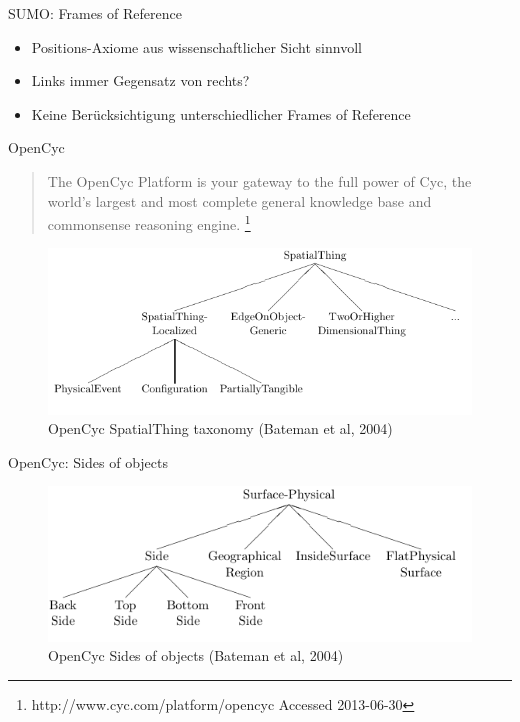 \documentclass[12pt,a4paper]{beamer}
\begin{document}
\begin{frame}{SUMO: Frames of Reference}
\begin{itemize}
\item Positions-Axiome aus wissenschaftlicher Sicht sinnvoll
\item Links immer Gegensatz von rechts?
\item Keine Berücksichtigung unterschiedlicher Frames of Reference
\end{itemize}
\end{frame}


\begin{frame}{OpenCyc}
\begin{quote}
The OpenCyc Platform is your gateway to the full power of Cyc, the world's largest and most complete general knowledge base and commonsense reasoning engine. \footnote{http://www.cyc.com/platform/opencyc Accessed 2013-06-30}
\end{quote}
\begin{figure}
\includegraphics[scale=0.45]{img/d2_opencyc_SpatialThing_taxonomy.png}
\caption{OpenCyc SpatialThing taxonomy (Bateman et al, 2004)}
\end{figure}
\end{frame}

\begin{frame}{OpenCyc: Sides of objects }
\begin{figure}
\includegraphics[scale=0.45]{img/d2_opencyc_sides_of_objects.png}
\caption{OpenCyc Sides of objects (Bateman et al, 2004)}
\end{figure}
\end{frame}
\end{document}
